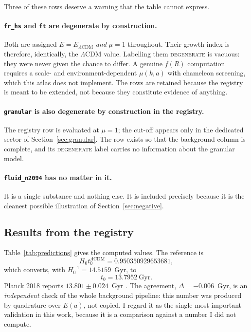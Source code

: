 \documentclass[11pt,a4paper]{article}
\theoremstyle{definition}
\newcommand{\Hzt}{H_0 t_0}
\begin{document}
Three of these rows deserve a warning that the table cannot express.

\paragraph{\texttt{fr\_hs} and \texttt{ft} are degenerate by construction.}
Both are assigned $E = E_{\Lambda\mathrm{CDM}}$ \emph{and} $\mu = 1$
throughout. Their growth index is therefore, identically, the $\Lambda$CDM
value. Labelling them \textsc{degenerate} is vacuous: they were never given
the chance to differ. A genuine $f(R)$ computation requires a scale- and
environment-dependent $\mu(k,a)$ with chameleon screening, which this atlas
does not implement. The rows are retained because the registry is meant to be
extended, not because they constitute evidence of anything.

\paragraph{\texttt{granular} is also degenerate by construction in the registry.}
The registry row is evaluated at $\mu = 1$; the cut-off appears only in the
dedicated sector of Section~\ref{sec:granular}. The row exists so that the
background column is complete, and its \textsc{degenerate} label carries no
information about the granular model.

\paragraph{\texttt{fluid\_n2094} has no matter in it.}
It is a single substance and nothing else. It is included precisely because it
is the cleanest possible illustration of Section~\ref{sec:negative}.

\subsection{Results from the registry}

Table~\ref{tab:predictions} gives the computed values. The reference is
\begin{equation}
\Hzt^{\Lambda\mathrm{CDM}} = 0.950350929653681,
\end{equation}
which converts, with $H_0^{-1} = 14.5159$~Gyr, to
\begin{equation}
t_0 = 13.7952~\mathrm{Gyr}.
\end{equation}
Planck 2018 reports $13.801 \pm 0.024$~Gyr \cite{planck2018}. The agreement,
$\Delta = -0.006$~Gyr, is an \emph{independent} check of the whole background
pipeline: this number was produced by quadrature over $E(a)$, not copied.
I regard it as the single most important validation in this work, because it
is a comparison against a number I did not compute.
\end{document}
